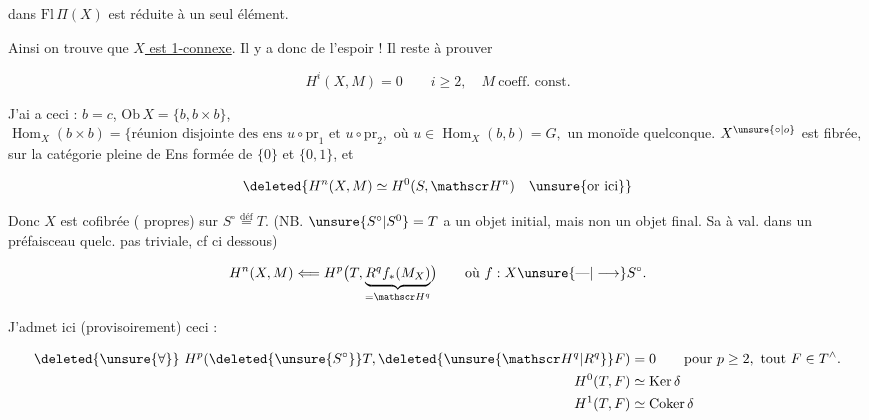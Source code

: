 
dans  $\mathrm{Fl}\,\Pi(X)$ est réduite à un seul élément.

Ainsi on trouve que \uline{$X$ est 1-connexe}. Il y a donc de l'espoir ! Il reste à prouver

\[
 H^i(X,M)=0 \qquad i\geq 2,\quad M\ \text{coeff. const.}
\]

J'ai   a ceci : $b=c$, $\mathrm{Ob}\,X=\{b,b\times b\}$, $\operatorname{Hom}_X(b\times b)=\{\text{réunion disjointe des ens }u\circ\mathrm{pr}_1\text{ et }u\circ\mathrm{pr}_2,\text{ où }u\in\operatorname{Hom}_X(b,b)=G,\text{ un monoïde quelconque.}$    $X^{\unsure{\circ|o}}$ est  fibrée,  sur la  catégorie pleine  de Ens formée de $\{0\}$ et $\{0,1\}$, et

\[
 \deleted{H^n(X,M)\simeq H^0(S,\mathscr H^n)\quad\unsure{\text{or ici}}}
\]

 Donc $X$ est cofibrée (  propres) sur $S^\circ\overset{\text{déf}}{=}T$. (NB. $\unsure{S^\circ|S^0}=T$ a un objet initial, mais non un objet final. Sa  à val. dans un préfaisceau quelc.  pas   triviale, cf ci dessous)

\[
 H^n(X,M)\Longleftarrow H^p\bigl(T,\underbrace{R^q f_*(M_X)}_{=\mathscr H^q}\bigr)
 \qquad \text{où }f:X\unsure{\text{---}|\longrightarrow} S^\circ .
\]

J'admet ici (provisoirement) ceci :

\[
 \begin{aligned}
 \deleted{\unsure{\forall}}\ H^p(\deleted{\unsure{S^\circ}}T,\deleted{\unsure{\mathscr H^q|R^q}}F)&=0\qquad\text{pour }p\geq2,\ \text{tout }F\in T^\wedge.\\
 H^0(T,F)&\simeq\operatorname{Ker}\delta\\
 H^1(T,F)&\simeq\operatorname{Coker}\delta
 \end{aligned}
\]


